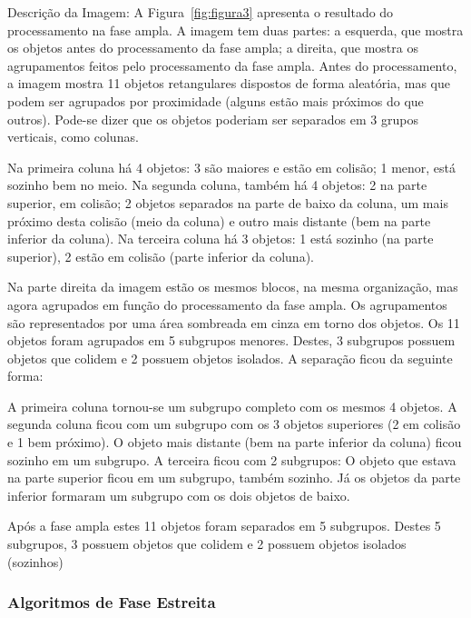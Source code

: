 \begin{framed}
\footnotesize
\noindent Descrição da Imagem: A Figura~\ref{fig:figura3} apresenta o resultado do processamento na fase ampla. A imagem tem duas partes: a esquerda, que  mostra os objetos antes do processamento da fase ampla; a direita, que mostra os agrupamentos feitos pelo processamento da fase ampla. Antes do processamento, a imagem mostra 11 objetos retangulares dispostos de forma aleatória, mas que podem ser agrupados por proximidade (alguns estão mais próximos do que outros). Pode-se dizer que os objetos poderiam ser separados em 3 grupos verticais, como colunas.

\noindent Na primeira coluna há 4 objetos: 3 são maiores e estão em colisão; 1 menor, está sozinho bem no meio. Na segunda coluna, também há 4 objetos: 2 na parte superior, em colisão;  2 objetos separados na parte de baixo da coluna, um mais próximo desta colisão (meio da coluna) e outro mais distante (bem na parte inferior da coluna). Na terceira coluna há 3 objetos: 1 está sozinho (na parte superior), 2 estão em colisão (parte inferior da coluna).

\noindent Na parte direita da imagem estão os mesmos blocos, na mesma organização, mas agora agrupados em função do processamento da fase ampla. Os agrupamentos são representados por uma área sombreada em cinza em torno dos objetos. Os 11 objetos foram agrupados em 5 subgrupos menores. Destes, 3 subgrupos possuem objetos que colidem e 2 possuem objetos isolados. A separação ficou da seguinte forma:

\noindent A primeira coluna tornou-se um subgrupo completo com os mesmos 4 objetos. A segunda coluna ficou com um subgrupo com os 3 objetos superiores (2 em colisão e 1 bem próximo). O objeto mais distante (bem na parte inferior da coluna) ficou sozinho em um subgrupo. A terceira ficou com 2 subgrupos: O objeto que estava na parte superior ficou em um subgrupo, também sozinho. Já os objetos da parte inferior formaram um subgrupo com os dois objetos de baixo.

\noindent Após a fase ampla estes 11 objetos foram separados em 5 subgrupos. Destes 5 subgrupos, 3 possuem objetos que colidem e 2 possuem objetos isolados (sozinhos)
\end{framed}

\subsubsection{Algoritmos de Fase Estreita}


